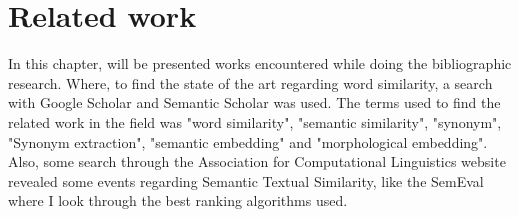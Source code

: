 





\section{Related work}\label{chap:relatedwork}



In this chapter, will be presented works encountered while doing the bibliographic research. Where, to find the state of the art regarding word similarity, a search with Google Scholar and Semantic Scholar was used. The terms used to find the related work in the field was "word similarity", "semantic similarity", "synonym", "Synonym extraction", "semantic embedding" and "morphological embedding". Also, some search through the Association for Computational Linguistics website revealed some events regarding Semantic Textual Similarity, like the SemEval where I look through the best ranking algorithms used.








% 



